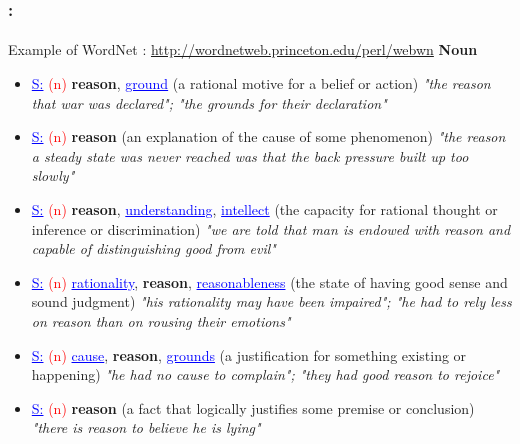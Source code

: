 \documentclass[xcolor=table]{beamer}
\begin{document}
\begin{frame}
	\frametitle{\insertshortsubtitle: \insertsection}
	\framesubtitle{\insertsubsection}

	\begin{exampleblock}{Example of WordNet : \small\url{http://wordnetweb.princeton.edu/perl/webwn}}
		\fontsize{6}{6}\selectfont
		{\small\bfseries Noun}
		\begin{itemize}\setlength\itemsep{0pt}
			\item \textcolor{blue}{\underline{S:}} \textcolor{red}{(n)} \textbf{reason}, \textcolor{blue}{\underline{ground}} (a rational motive for a belief or action) \textit{"the reason that war was declared"; "the grounds for their declaration"}
			\item \textcolor{blue}{\underline{S:}} \textcolor{red}{(n)} \textbf{reason} (an explanation of the cause of some phenomenon) \textit{"the reason a steady state was never reached was that the back pressure built up too slowly"}
			\item \textcolor{blue}{\underline{S:}} \textcolor{red}{(n)} \textbf{reason}, \textcolor{blue}{\underline{understanding}}, \textcolor{blue}{\underline{intellect}} (the capacity for rational thought or inference or discrimination) \textit{"we are told that man is endowed with reason and capable of distinguishing good from evil"}
			\item \textcolor{blue}{\underline{S:}} \textcolor{red}{(n)} \textcolor{blue}{\underline{rationality}}, \textbf{reason}, \textcolor{blue}{\underline{reasonableness}} (the state of having good sense and sound judgment) \textit{"his rationality may have been impaired"; "he had to rely less on reason than on rousing their emotions"}
			\item \textcolor{blue}{\underline{S:}} \textcolor{red}{(n)} \textcolor{blue}{\underline{cause}}, \textbf{reason}, \textcolor{blue}{\underline{grounds}} (a justification for something existing or happening) \textit{"he had no cause to complain"; "they had good reason to rejoice"}
			\item \textcolor{blue}{\underline{S:}} \textcolor{red}{(n)} \textbf{reason} (a fact that logically justifies some premise or conclusion) \textit{"there is reason to believe he is lying"}
		\end{itemize}
		

\end{exampleblock}
\end{frame}
\end{document}
